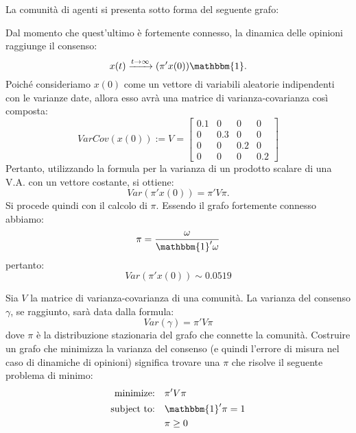 
\begin{alphaparts}
    \questionpart %
    La comunità di agenti si presenta sotto forma del seguente grafo:
    
    Dal momento che quest'ultimo è fortemente connesso, la dinamica delle opinioni raggiunge il consenso:
    \[x(t) \xrightarrow[]{t\to \infty}(\pi'x(0))\mathbbm{1}.\]
    Poiché consideriamo \(x(0)\) come un vettore di variabili aleatorie indipendenti con le varianze date, allora esso avrà una matrice di varianza-covarianza così composta:
    \[VarCov(x(0)):= V= \begin{bmatrix}
        0.1 & 0 & 0 & 0 \\
        0 & 0.3 & 0 & 0\\
        0 & 0 & 0.2 & 0\\
        0 & 0 & 0 & 0.2
    \end{bmatrix}\]
    Pertanto, utilizzando la formula per la varianza di un prodotto scalare di una V.A. con un vettore costante, si ottiene:
    \[Var(\pi'x(0)) = \pi' V \pi.\]
    Si procede quindi con il calcolo di \(\pi\). Essendo il grafo fortemente connesso abbiamo:
    \[\pi = \frac{\omega}{\mathbbm{1}'\omega}\]
    pertanto:
    \[Var(\pi'x(0)) \sim 0.0519\]

    \questionpart %
    Sia \(V\) la matrice di varianza-covarianza di una comunità. La varianza del consenso \(\gamma\), se raggiunto, sarà data dalla formula:
    \[Var(\gamma) = \pi' V \pi\]
    dove \(\pi\) è la distribuzione stazionaria del grafo che connette la comunità. Costruire un grafo che minimizza la varianza del consenso (e quindi l'errore di misura nel caso di dinamiche di opinioni) significa trovare una \(\pi\) che risolve il seguente problema di minimo:
    \begin{align*}
        \text{minimize:} \quad & \pi'V\pi \\
        \text{subject to:} \quad &\mathbbm{1}'\pi = 1 \\
        & \pi \geq  0
    \end{align*}


\end{alphaparts}
